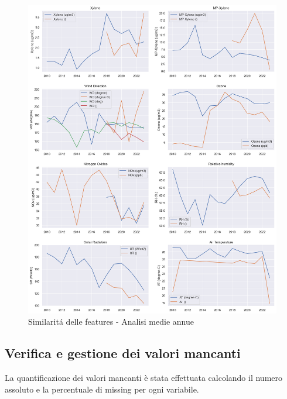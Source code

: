 \documentclass[a4paper,12pt]{report}
\begin{document}
	\begin{figure}[H]
		\centering
		\includegraphics[width=1.0\textwidth]{img/feat_red_pm.png}
		\caption{Similaritá delle features - Analisi medie annue}
	\end{figure}
	
	\subsection{Verifica e gestione dei valori mancanti}
	La quantificazione dei valori mancanti \`e stata effettuata calcolando il numero assoluto e la percentuale di missing per ogni variabile. 
	
\end{document}
